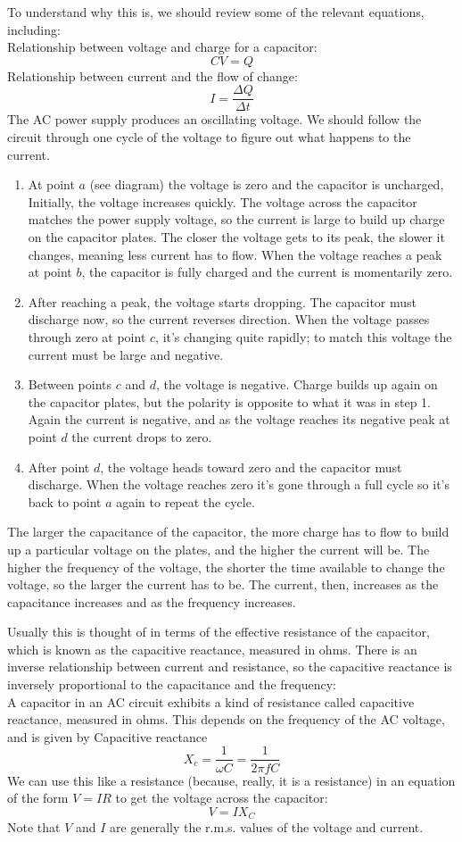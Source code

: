 \documentclass[../main.tex]{subfiles}
\begin{document}
To understand why this is, we should review some of the relevant equations, including:\\
Relationship between voltage and charge for a capacitor:
\[
    CV = Q
\]
Relationship between current and the flow of change:
\[
    I = \frac{\Delta Q}{\Delta t}
\]
The AC power supply produces an oscillating voltage. We should follow the circuit through one cycle of the voltage to figure out what happens to the current.
\begin{enumerate}[label= Step \arabic*:]
    \item At point $ a $ (see diagram) the voltage is zero and the capacitor is uncharged, Initially, the voltage increases quickly. The voltage across the capacitor matches the power supply voltage, so the current is large to build up charge on the capacitor plates. The closer the voltage gets to its peak, the slower it changes, meaning less current has to flow. When the voltage reaches a peak at point $ b $, the capacitor is fully charged and the current is momentarily zero.
    \item After reaching a peak, the voltage starts dropping. The capacitor must discharge now, so the current reverses direction. When the voltage passes through zero at point $ c $, it's changing quite rapidly; to match this voltage the current must be large and negative.
    \item Between points $ c $ and $ d $, the voltage is negative. Charge builds up again on the capacitor plates, but the polarity is opposite to what it was in step 1. Again the current is negative, and as the voltage reaches its negative peak at point $ d $ the current drops to zero.
    \item After point $ d $, the voltage heads toward zero and the capacitor must discharge. When the voltage reaches zero it's gone through a full cycle so it's back to point $ a $ again to repeat the cycle.
\end{enumerate}
The larger the capacitance of the capacitor, the more charge has to flow to build up a particular voltage on the plates, and the higher the current will be. The higher the frequency of the voltage, the shorter the time available to change the voltage, so the larger the current has to be. The current, then, increases as the capacitance increases and as the frequency increases.


Usually this is thought of in terms of the effective resistance of the capacitor, which is known as the capacitive reactance, measured in ohms. There is an inverse relationship between current and resistance, so the capacitive reactance is inversely proportional to the capacitance and the frequency:\\
A capacitor in an AC circuit exhibits a kind of resistance called capacitive reactance, measured in ohms. This depends on the frequency of the AC voltage, and is given by Capacitive reactance
\[
    X_c = \frac{1}{\omega C}=\frac{1}{2\pi fC}
\]
We can use this like a resistance (because, really, it is a resistance) in an equation of the form $ V = IR $ to get the voltage across the capacitor:
\[V = I X_C\]
Note that $ V $ and $ I $ are generally the r.m.s. values of the voltage and current.
\end{document}
